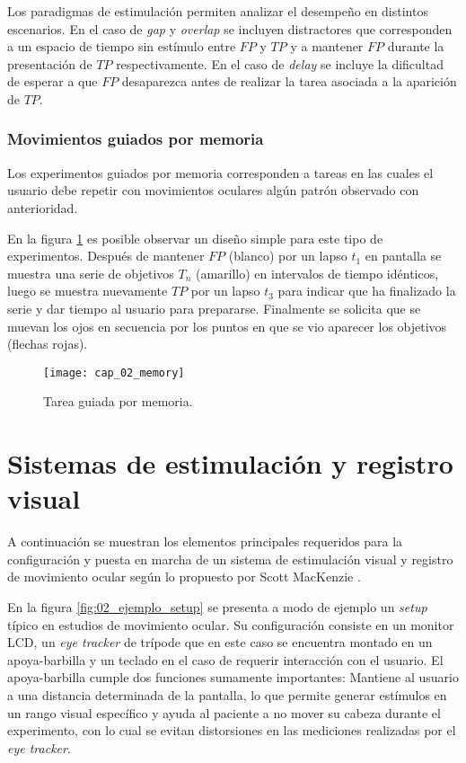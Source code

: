 \documentclass[../main.tex]{subfiles}
\begin{document}
				Los paradigmas de estimulación permiten analizar el desempeño en distintos escenarios. En el caso de \textit{gap} y \textit{overlap} se incluyen distractores que corresponden a un espacio de tiempo sin estímulo entre $FP$ y $TP$ y a mantener $FP$ durante la presentación de $TP$ respectivamente. En el caso de \textit{delay} se incluye la dificultad de esperar a que $FP$ desaparezca antes de realizar la tarea asociada a la aparición de $TP$. 

			\vspace{-5mm}
			\subsubsection{Movimientos guiados por memoria}
			\label{ssub:movimientos_memoria}
				Los experimentos guiados por memoria corresponden a tareas en las cuales el usuario debe repetir con movimientos oculares algún patrón observado con anterioridad. 

				En la figura \ref{fig:02_memory} es posible observar un diseño simple para este tipo de experimentos. Después de mantener $FP$ (blanco) por un lapso $t_1$ en pantalla se muestra una serie de objetivos $T_n$ (amarillo) en intervalos de tiempo idénticos, luego se muestra nuevamente $TP$ por un lapso $t_3$ para indicar que ha finalizado la serie y dar tiempo al usuario para prepararse. Finalmente se solicita que se muevan los ojos en secuencia por los puntos en que se vio aparecer los objetivos (flechas rojas).
				\begin{figure}[H]
					\centering
					\texttt{[image: cap\_02\_memory]}
					\caption{Tarea guiada por memoria.}
					\label{fig:02_memory}
				\end{figure} 
	
	\section{Sistemas de estimulación y registro visual}
	\label{sec:02_sistemas_de_estimulacion_registro_visual}
		A continuación se muestran los elementos principales requeridos para la configuración y puesta en marcha de un sistema de estimulación visual y registro de movimiento ocular según lo propuesto por Scott MacKenzie \cite{article:baseInfo}. 

		En la figura \ref{fig:02_ejemplo_setup} se presenta a modo de ejemplo un \textit{setup} típico en estudios de movimiento ocular. Su configuración consiste en un monitor LCD, un \textit{eye tracker} de trípode que en este caso se encuentra montado en un apoya-barbilla y un teclado en el caso de requerir interacción con el usuario. El apoya-barbilla cumple dos funciones sumamente importantes: Mantiene al usuario a una distancia determinada de la pantalla, lo que permite generar estímulos en un rango visual específico y ayuda al paciente a no mover su cabeza durante el experimento, con lo cual se evitan distorsiones en las mediciones realizadas por el \textit{eye tracker}.  
\end{document}
